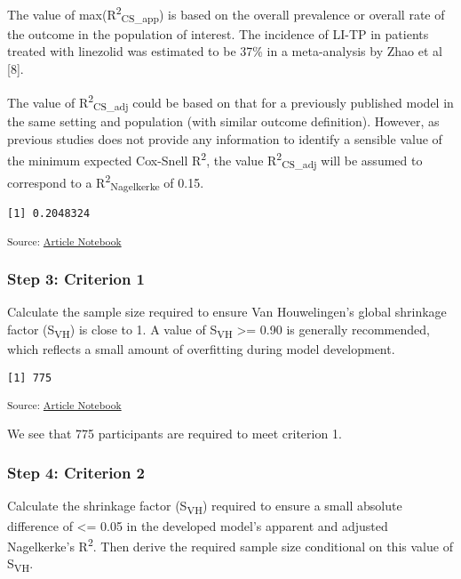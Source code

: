 \documentclass[
  letterpaper,
  DIV=11,
  numbers=noendperiod]{scrartcl}
\begin{document}
The value of max(R\textsuperscript{2}\textsubscript{CS\_app}) is based
on the overall prevalence or overall rate of the outcome in the
population of interest. The incidence of LI-TP in patients treated with
linezolid was estimated to be 37\% in a meta-analysis by Zhao et al
{[}8{]}.

The value of R\textsuperscript{2}\textsubscript{CS\_adj} could be based
on that for a previously published model in the same setting and
population (with similar outcome definition). However, as previous
studies does not provide any information to identify a sensible value of
the minimum expected Cox-Snell R\textsuperscript{2}, the value
R\textsuperscript{2}\textsubscript{CS\_adj} will be assumed to
correspond to a R\textsuperscript{2}\textsubscript{Nagelkerke} of 0.15.

\begin{verbatim}
[1] 0.2048324
\end{verbatim}

\textsubscript{Source:
\href{https://AnTangQuoc.github.io/LZD-TP-pred-model/index.qmd.html}{Article
Notebook}}

\subsubsection{Step 3: Criterion 1}\label{step-3-criterion-1}

Calculate the sample size required to ensure Van Houwelingen's global
shrinkage factor (S\textsubscript{VH}) is close to 1. A value of
S\textsubscript{VH} \textgreater= 0.90 is generally recommended, which
reflects a small amount of overfitting during model development.

\begin{verbatim}
[1] 775
\end{verbatim}

\textsubscript{Source:
\href{https://AnTangQuoc.github.io/LZD-TP-pred-model/index.qmd.html}{Article
Notebook}}

We see that 775 participants are required to meet criterion 1.

\subsubsection{Step 4: Criterion 2}\label{step-4-criterion-2}

Calculate the shrinkage factor (S\textsubscript{VH}) required to ensure
a small absolute difference of \textless= 0.05 in the developed model's
apparent and adjusted Nagelkerke's R\textsuperscript{2}. Then derive the
required sample size conditional on this value of S\textsubscript{VH}.
\end{document}
